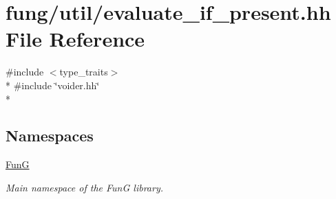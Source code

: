 \hypertarget{evaluate__if__present_8hh}{}\section{fung/util/evaluate\+\_\+if\+\_\+present.hh File Reference}
\label{evaluate__if__present_8hh}
{\ttfamily \#include $<$type\+\_\+traits$>$}\\*
{\ttfamily \#include \char`\"{}voider.\+hh\char`\"{}}\\*
\subsection*{Namespaces}
\begin{DoxyCompactItemize}
\item 
 \hyperlink{namespaceFunG}{Fun\+G}
\begin{DoxyCompactList}\small\item\em Main namespace of the Fun\+G library. \end{DoxyCompactList}\end{DoxyCompactItemize}
